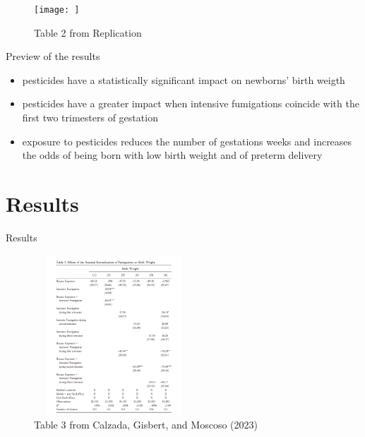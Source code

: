 \documentclass[hyperref={pdfpagelabels=false}]{beamer}
\begin{document}
	\begin{frame}
		\begin{figure}[H]
			\centering
			\texttt{[image: ]}
			\caption{Table 2 from Replication}
			\label{fig:enter-label}
		\end{figure}
		
	\end{frame}
	
	
	
	
	
	\begin{frame}{Preview of the results}
		\begin{itemize}
			\item pesticides have a statistically significant impact on newborns' birth weigth
			\item pesticides have a greater impact when intensive fumigations coincide with the first two trimesters of gestation
			\item exposure to pesticides reduces the number of gestations weeks and increases the odds of being born with low birth weight and of preterm delivery
		\end{itemize}
		
		
		
	\end{frame}
	
	\section{Results}
	
	\begin{frame}{Results}
		
		\begin{figure}
			\centering
			\includegraphics[width=6cm, height=6cm]{figures-paper/table3.png}
			\caption{Table 3 from Calzada, Gisbert, and Moscoso (2023)}
			\label{fig:enter-label}
		\end{figure}
		
	\end{frame}
	
\end{document}
